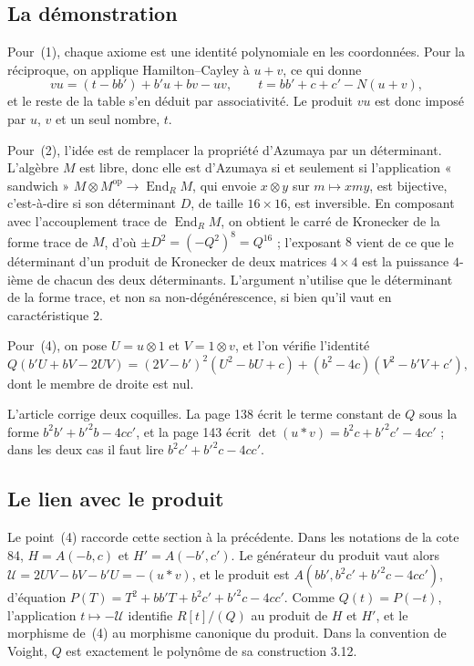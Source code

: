 \documentclass[11pt,a4paper]{amsart}
\theoremstyle{definition}
\theoremstyle{plain}
\theoremstyle{remark}
\theoremstyle{plain}
\begin{document}
\subsection{La démonstration}

Pour~(1), chaque axiome est une identité polynomiale en les coordonnées. Pour la réciproque, on applique Hamilton--Cayley à $u + v$, ce qui donne
\[
vu = (t - bb') + b'u + bv - uv, \qquad t = bb' + c + c' - N(u + v),
\]
et le reste de la table s'en déduit par associativité. Le produit $vu$ est donc imposé par $u$, $v$ et un seul nombre, $t$.

Pour~(2), l'idée est de remplacer la propriété d'Azumaya par un déterminant. L'algèbre $M$ est libre, donc elle est d'Azumaya si et seulement si l'application « sandwich » $M\otimes M^{\mathrm{op}} \to \operatorname{End}_R M$, qui envoie $x\otimes y$ sur $m \mapsto xmy$, est bijective, c'est-à-dire si son déterminant $D$, de taille $16\times 16$, est inversible. En composant avec l'accouplement trace de $\operatorname{End}_R M$, on obtient le carré de Kronecker de la forme trace de $M$, d'où $\pm D^2 = (-Q^2)^8 = Q^{16}$ ; l'exposant $8$ vient de ce que le déterminant d'un produit de Kronecker de deux matrices $4\times 4$ est la puissance $4$-ième de chacun des deux déterminants. L'argument n'utilise que le déterminant de la forme trace, et non sa non-dégénérescence, si bien qu'il vaut en caractéristique $2$.

Pour~(4), on pose $U = u\otimes 1$ et $V = 1\otimes v$, et l'on vérifie l'identité
\[
Q(b'U + bV - 2UV) = (2V - b')^2(U^2 - bU + c) + (b^2 - 4c)(V^2 - b'V + c'),
\]
dont le membre de droite est nul.

L'article corrige deux coquilles. La page 138 écrit le terme constant de $Q$ sous la forme $b^2b' + b'^2b - 4cc'$, et la page 143 écrit $\det(u * v) = b^2c + b'^2c' - 4cc'$ ; dans les deux cas il faut lire $b^2c' + b'^2c - 4cc'$.

\subsection{Le lien avec le produit}

Le point~(4) raccorde cette section à la précédente. Dans les notations de la cote 84, $H = A(-b, c)$ et $H' = A(-b', c')$. Le générateur du produit vaut alors $\mathcal U = 2UV - bV - b'U = -(u * v)$, et le produit est $A(bb', b^2c' + b'^2c - 4cc')$, d'équation $P(T) = T^2 + bb'T + b^2c' + b'^2c - 4cc'$. Comme $Q(t) = P(-t)$, l'application $t \mapsto -\mathcal U$ identifie $R[t]/(Q)$ au produit de $H$ et $H'$, et le morphisme de~(4) au morphisme canonique du produit. Dans la convention de Voight, $Q$ est exactement le polynôme de sa construction 3.12.
\end{document}
